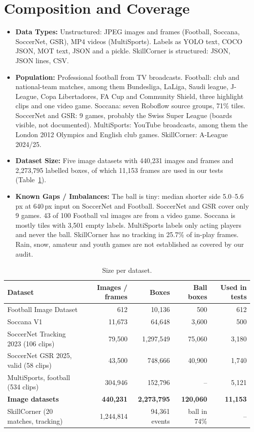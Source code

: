 \documentclass[11pt, a4paper]{article}
\begin{document}
\section{Composition and Coverage}
\begin{itemize}
    \item \textbf{Data Types:} Unstructured: JPEG images and frames (Football, Soccana, SoccerNet, GSR), MP4 videos (MultiSports). Labels as YOLO text, COCO JSON, MOT text, JSON and a pickle. SkillCorner is structured: JSON, JSON lines, CSV.
    \item \textbf{Population:} Professional football from TV broadcasts. Football: club and national-team matches, among them Bundesliga, LaLiga, Saudi league, J-League, Copa Libertadores, FA Cup and Community Shield, three highlight clips and one video game. Soccana: seven Roboflow source groups, 71\% tiles. SoccerNet and GSR: 9 games, probably the Swiss Super League (boards visible, not documented). MultiSports: YouTube broadcasts, among them the London 2012 Olympics and English club games. SkillCorner: A-League 2024/25.
    \item \textbf{Dataset Size:} Five image datasets with 440,231 images and frames and 2,273,795 labelled boxes, of which 11,153 frames are used in our tests (Table~\ref{tab:size}).
    \item \textbf{Known Gaps / Imbalances:} The ball is tiny: median shorter side 5.0--5.6\,px at 640\,px input on SoccerNet and Football. SoccerNet and GSR cover only 9 games. 43 of 100 Football val images are from a video game. Soccana is mostly tiles with 3,501 empty labels. MultiSports labels only acting players and never the ball. SkillCorner has no tracking in 25.7\% of in-play frames. Rain, snow, amateur and youth games are not established as covered by our audit.
\end{itemize}

\begin{table}[ht]
\centering\footnotesize
\begin{tabular}{@{}lrrrr@{}}
\toprule
\textbf{Dataset} & \textbf{Images / frames} & \textbf{Boxes} & \textbf{Ball boxes} & \textbf{Used in tests} \\
\midrule
Football Image Dataset & 612 & 10,136 & 500 & 612 \\
Soccana V1 & 11,673 & 64,648 & 3,600 & 500 \\
SoccerNet Tracking 2023 (106 clips) & 79,500 & 1,297,549 & 75,060 & 3,180 \\
SoccerNet GSR 2025, valid (58 clips) & 43,500 & 748,666 & 40,900 & 1,740 \\
MultiSports, football (534 clips) & 304,946 & 152,796 & -- & 5,121 \\
\midrule
\textbf{Image datasets} & \textbf{440,231} & \textbf{2,273,795} & \textbf{120,060} & \textbf{11,153} \\
\midrule
SkillCorner (20 matches, tracking) & 1,244,814 & 94,361 events & ball in 74\% & -- \\
\bottomrule
\end{tabular}
\caption{Size per dataset.}
\label{tab:size}
\end{table}
\end{document}
